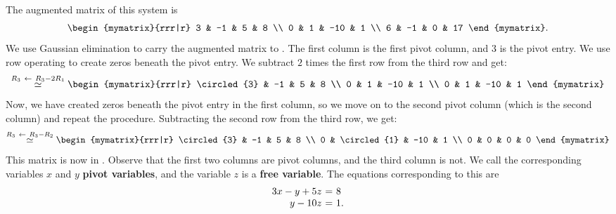 \begin{solution} The augmented matrix of this system is
  \begin{equation*}
    \begin{mymatrix}{rrr|r}
      3 &  -1  &  5 & 8 \\
      0 &   1 & -10 & 1 \\
      6 &  -1  &  0 & 17
    \end{mymatrix}.
  \end{equation*}
  We use Gaussian elimination to carry the augmented matrix to
  {\ef}. The first column is the first pivot column, and $3$ is the
  pivot entry. We use row operating to create zeros beneath the pivot
  entry. We subtract $2$ times the first row from the third row and get:
  \begin{equation*}
  \stackrel{R_3\rowop R_3-2R_1}{\roweq}
    \begin{mymatrix}{rrr|r}
      \circled{3} &  -1  &  5 & 8 \\
      0 &   1 & -10 & 1 \\
      0 &   1 & -10 & 1
    \end{mymatrix}
  \end{equation*}
  Now, we have created zeros beneath the pivot entry in the first
  column, so we move on to the second pivot column (which is the
  second column) and repeat the procedure. Subtracting the second row
  from the third row, we get:
  \begin{equation*}
  \stackrel{R_3\rowop R_3-R_2}{\roweq}
    \begin{mymatrix}{rrr|r}
      \circled{3} &  -1  &  5 & 8 \\
      0 &   \circled{1} & -10 & 1 \\
      0 &   0 & 0 & 0
    \end{mymatrix}
  \end{equation*}
  This matrix is now in {\ef}. Observe that the first two columns are
  pivot columns, and the third column is not. We call the
  corresponding variables $x$ and $y$
  \textbf{pivot variables},
  and the variable $z$ is a
  \textbf{free variable}.
  The equations corresponding to
  this {\ef} are
  \begin{equation*}
    \begin{array}{r@{~}c@{~}l}
      3x - y + 5z &=& 8 \\
      y - 10z &=& 1.
    \end{array}
  \end{equation*}

\end{solution}
